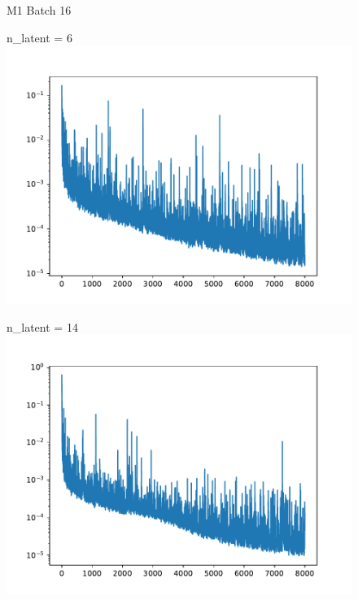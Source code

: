 \documentclass[USenglish]{article}
\newcommand{\1}{\begin{pmatrix}
		1\\
		1
\end{pmatrix}}
\begin{document}
\begin{figure}
M1 Batch 16\\[0.5em]
\begin{minipage}{0.32\textwidth}
	\centering
	n\_latent = 6\\
	\includegraphics[width=\textwidth, trim={20 0 45 30}, clip]{loss_convAE_trial_001_batch_016_n_dense_006.pdf}
\end{minipage}
\begin{minipage}{0.32\textwidth}
	\centering
	n\_latent = 14\\
	\includegraphics[width=\textwidth, trim={20 0 45 30}, clip]{loss_convAE_trial_001_batch_016_n_dense_014.pdf}
\end{minipage}
\begin{minipage}{0.32\textwidth}

\end{minipage}
\end{figure}
\end{document}
